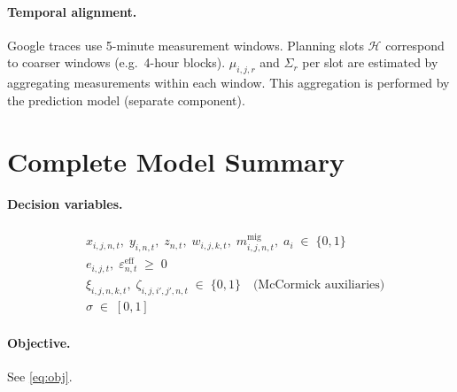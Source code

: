 \documentclass[11pt,a4paper]{article}
\newcommand{\cH}{\mathcal{H}}           %
\newcommand{\eps}{\varepsilon}          %
\begin{document}
\paragraph{Temporal alignment.}
Google traces use 5-minute measurement windows.  Planning slots $\cH$
correspond to coarser windows (e.g.\ 4-hour blocks).  $\mu_{i,j,r}$ and
$\Sigma_r$ per slot are estimated by aggregating measurements within each
window.  This aggregation is performed by the prediction model (separate
component).

\section{Complete Model Summary}

\paragraph{Decision variables.}
\begin{align*}
  &x_{i,j,n,t},\;y_{i,n,t},\;z_{n,t},\;w_{i,j,k,t},\;m_{i,j,n,t}^{\text{mig}},\;a_i
    \;\in\;\{0,1\}  \\
  &e_{i,j,t},\;\eps_{n,t}^{\text{eff}} \;\ge\; 0  \\
  &\xi_{i,j,n,k,t},\;\zeta_{i,j,i',j',n,t} \;\in\;\{0,1\} \quad\text{(McCormick auxiliaries)}\\
  &\sigma \;\in\; [0,1]
\end{align*}

\paragraph{Objective.}  See \eqref{eq:obj}.
\end{document}
